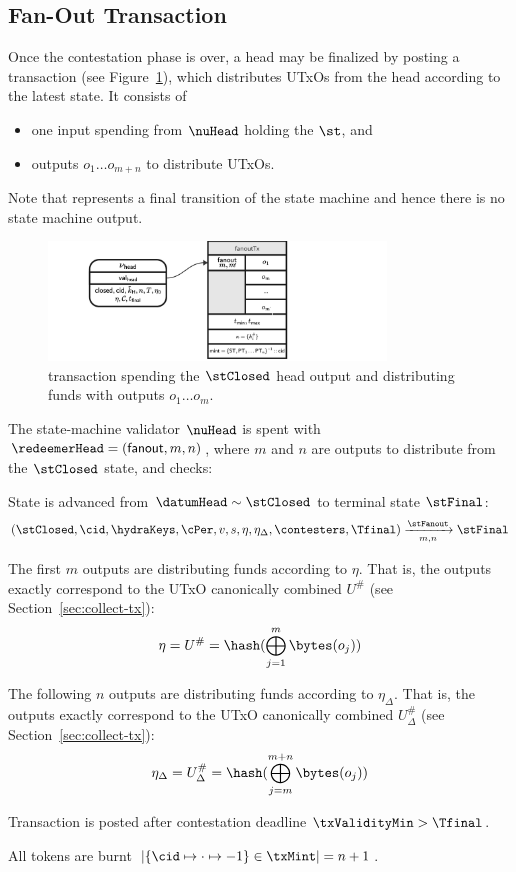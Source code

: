 \subsection{Fan-Out Transaction}

Once the contestation phase is over, a head may be finalized by posting a
\mtxFanout{} transaction (see Figure~\ref{fig:fanoutTx}), which
distributes UTxOs from the head according to the latest state. It consists of
\begin{itemize}
	\item one input spending from $\nuHead$ holding the $\st$, and
	\item outputs $o_{1} \dots o_{m+n}$ to distribute UTxOs.
\end{itemize}

Note that \mtxFanout{} represents a final transition of the state machine and
hence there is no state machine output.

\begin{figure}
	\centering
        \includegraphics[width=0.8\textwidth]{Hydra/Protocol/Figures/fanoutTx.pdf}
	\caption{\mtxFanout{} transaction spending the $\stClosed$ head output and
		distributing funds with outputs $o_{1} \dots o_{m}$.}\label{fig:fanoutTx}
\end{figure}

\noindent The state-machine validator $\nuHead$ is spent with
$\redeemerHead = (\mathsf{fanout}, m, n)$, where $m$ and $n$ are
outputs to distribute from the $\stClosed$ state, and checks:
\begin{menumerate}
	\item State is advanced from $\datumHead \sim \stClosed$ to terminal state
	$\stFinal$: %
	\[
		(\stClosed,\cid,\hydraKeys,\cPer,v, s,\eta,\eta_{\Delta},\contesters,\Tfinal) \xrightarrow[m,n]{\stFanout} \stFinal
	\]
	\item The first $m$ outputs are distributing funds according to $\eta$. That is,
	the outputs exactly correspond to the UTxO canonically combined $U^{\#}$ (see
	Section~\ref{sec:collect-tx}):
	\[
		\eta = U^{\#} = \hash(\bigoplus_{j=1}^{m} \bytes(o_{j}))
	\]
	\item The following $n$ outputs are distributing funds according to
	$\eta_{\Delta}$. That is, the outputs exactly correspond to the UTxO canonically
	combined $U^{\#}_{\Delta}$ (see Section~\ref{sec:collect-tx}):
	\[
		\eta_{\Delta} = U^{\#}_{\Delta} = \hash(\bigoplus_{j=m}^{m+n} \bytes(o_{j}))
	\]
	\item Transaction is posted after contestation deadline $\txValidityMin > \Tfinal$.
	\item All tokens are burnt
	$|\{\cid \mapsto \cdot \mapsto -1\} \in \txMint| = n + 1$.
\end{menumerate}

